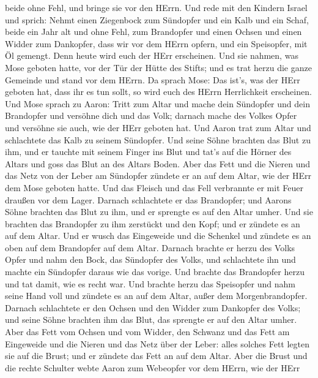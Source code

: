 beide ohne Fehl, und bringe sie vor den HErrn.  Und rede mit
den Kindern Israel und sprich: Nehmt einen Ziegenbock zum Sündopfer und
ein Kalb und ein Schaf, beide ein Jahr alt und ohne Fehl, zum Brandopfer
 und einen Ochsen und einen Widder zum Dankopfer, dass wir
vor dem HErrn opfern, und ein Speisopfer, mit Öl gemengt. Denn heute
wird euch der HErr erscheinen.  Und sie nahmen, was Mose
geboten hatte, vor der Tür der Hütte des Stifts; und es trat herzu die
ganze Gemeinde und stand vor dem HErrn.  Da sprach Mose: Das
ist's, was der HErr geboten hat, dass ihr es tun sollt, so wird euch des
HErrn Herrlichkeit erscheinen.  Und Mose sprach zu Aaron:
Tritt zum Altar und mache dein Sündopfer und dein Brandopfer und
versöhne dich und das Volk; darnach mache des Volkes Opfer und versöhne
sie auch, wie der HErr geboten hat.  Und Aaron trat zum
Altar und schlachtete das Kalb zu seinem Sündopfer.  Und
seine Söhne brachten das Blut zu ihm, und er tauchte mit seinem Finger
ins Blut und tat's auf die Hörner des Altars und goss das Blut an des
Altars Boden.  Aber das Fett und die Nieren und das Netz
von der Leber am Sündopfer zündete er an auf dem Altar, wie der HErr dem
Mose geboten hatte.  Und das Fleisch und das Fell
verbrannte er mit Feuer draußen vor dem Lager.  Darnach
schlachtete er das Brandopfer; und Aarons Söhne brachten das Blut zu
ihm, und er sprengte es auf den Altar umher.  Und sie
brachten das Brandopfer zu ihm zerstückt und den Kopf; und er zündete es
an auf dem Altar.  Und er wusch das Eingeweide und die
Schenkel und zündete es an oben auf dem Brandopfer auf dem Altar.
 Darnach brachte er herzu des Volks Opfer und nahm den
Bock, das Sündopfer des Volks, und schlachtete ihn und machte ein
Sündopfer daraus wie das vorige.  Und brachte das
Brandopfer herzu und tat damit, wie es recht war.  Und
brachte herzu das Speisopfer und nahm seine Hand voll und zündete es an
auf dem Altar, außer dem Morgenbrandopfer.  Darnach
schlachtete er den Ochsen und den Widder zum Dankopfer des Volks; und
seine Söhne brachten ihm das Blut, das sprengte er auf den Altar umher.
 Aber das Fett vom Ochsen und vom Widder, den Schwanz und
das Fett am Eingeweide und die Nieren und das Netz über der Leber:
 alles solches Fett legten sie auf die Brust; und er
zündete das Fett an auf dem Altar.  Aber die Brust und die
rechte Schulter webte Aaron zum Webeopfer vor dem HErrn, wie der HErr
